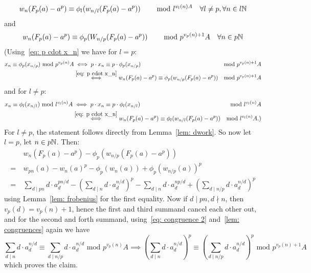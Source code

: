 \begin{beweis}
    \[
        w_n(F_p(a)-a^p) \equiv \phi_l(w_{n/l}(F_p(a)-a^p))
         \text{\hskip8mm mod }l^{v_l(n)A} \quad \forall l \neq p, \forall n \in l\mathbb{N}
    \]
    and 
    \[
      w_n(F_p(a)-a^p) \equiv \phi_p(W_{n/p}(F_p(a)-a^p)) 
      \text{\hskip8mm mod } p^{v_p(n)+1}A \quad \forall n \in p\mathbb{N}
    \]
    (Using~\ref{eq: p cdot x_n} we have for $l=p$:
    \begin{align*}
        x_n \equiv \phi_p(x_{n/p}) \text{ mod }p^{v_p(n)}A
        &\iff p \cdot x_n \equiv p \cdot \phi_p(x_{n/p}) 
        &\text{mod }p^{v_p(n)+1}A \\
        &\overset{\ref{eq: p cdot x_n}}{\iff} w_n(F_p(a)-a^p) \equiv \phi_p(w_{n/p}(F_p(a)-a^p)) 
        &\text{mod }p^{v_p(n)+1}A
    \end{align*}
    and for $l \neq p$: 
    \begin{align*}
        x_n \equiv \phi_l(x_{n/l}) \text{ mod }l^{v_l(n)}A
        &\iff p \cdot x_n \equiv p \cdot \phi_l(x_{n/l}) 
        &\text{mod }l^{v_l(n)}A \\
        &\overset{\ref{eq: p cdot x_n}}{\iff} w_n(F_p(a)-a^p) \equiv \phi_l(w_{n/l}(F_p(a)-a^p)) 
        &\text{mod }l^{v_l(n)}A.)
    \end{align*}
    For $l \neq p$, the statement follows directly from Lemma~\ref{lem: dwork}.
    So now let $l = p$, let $n \in p\mathbb{N}$. Then:
    \begin{align*}
        &w_n(F_p(a)-a^p) - \phi_p(w_{n/p}(F_p(a)-a^p)) \\
        = \ &w_{pn}(a) - w_n(a)^p - \phi_p(w_n(a)) + \phi_p(w_{n/p}(a))^p \\
        = \ &\sum_{d \mid pn}d \cdot a_d^{pn/d} - ( \sum_{d \mid n}d \cdot a_d^{n/d} )^p 
        - \sum_{d \mid n}d \cdot a_d^{np/d} + ( \sum_{d \mid n/p}d \cdot a_d^{n/d} )^p
    \end{align*}
    using Lemma~\ref{lem: frobenius} for the first equality.
    Now if $d \mid pn, d \nmid n$, then $v_p(d) = v_p(n)+1$, hence the first and third summand 
    cancel each other out, and for the second and forth summand, using~\ref{eq: congruence 2} and~\ref{lem: congruences}
    again we have 
    \[
        \sum_{d \mid n}d \cdot a_d^{n/d} \equiv \sum_{d \mid n/p}d \cdot a_d^{n/d}
        \text{ mod }p^{v_p(n)}A
        \implies ( \sum_{d \mid n}d \cdot a_d^{n/d} )^p  \equiv 
        ( \sum_{d \mid n/p}d \cdot a_d^{n/d} )^p
        \text{ mod }p^{v_p(n)+1}A
    \]
    which proves the claim.
\end{beweis}

